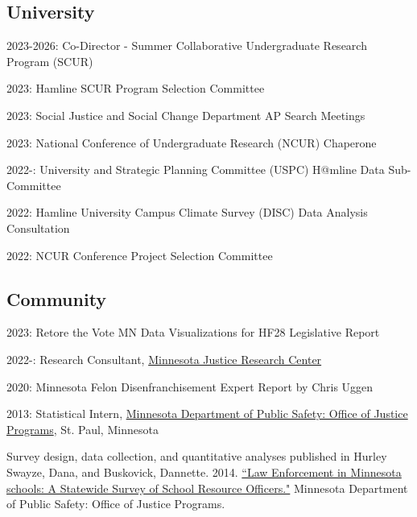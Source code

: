 \documentclass[letterpaper]{article}
\renewenvironment{itemize}{
  \begin{list}{}{
    \setlength{\leftmargin}{1.5em}
  }
}{
  \end{list}
}
\begin{document}
\subsection*{University}
\begin{itemize}
\item 2023-2026: Co-Director - Summer Collaborative Undergraduate Research Program (SCUR)
\item 2023: Hamline SCUR Program Selection Committee
\item 2023: Social Justice and Social Change Department AP Search Meetings
\item 2023: National Conference of Undergraduate Research (NCUR) Chaperone
\item 2022-: University and Strategic Planning Committee (USPC) H@mline Data Sub-Committee
\item 2022: Hamline University Campus Climate Survey (DISC) Data Analysis Consultation
\item 2022: NCUR Conference Project Selection Committee
\end{itemize}

\subsection*{Community}

\begin{itemize}

\item 2023: Retore the Vote MN Data Visualizations for HF28 Legislative Report
\item 2022-: Research Consultant, \href{https://www.mnjrc.org/about-us}{Minnesota Justice Research Center}

\item 2020: Minnesota Felon Disenfranchisement Expert Report by Chris Uggen 

\item 2013: Statistical Intern, \href{https://dps.mn.gov/divisions/ojp/statistical-analysis-center/Pages/default.aspx}{Minnesota Department of Public Safety: Office of Justice Programs}, St. Paul, Minnesota
\begin{itemize}
	\item Survey design, data collection, and quantitative analyses published in Hurley Swayze, Dana, and  Buskovick, Dannette. 2014. \href{https://dps.mn.gov/divisions/ojp/forms-documents/Documents/SRO20REPORT.pdf}{``Law Enforcement in Minnesota schools: A Statewide Survey of School Resource Officers."} Minnesota Department of Public Safety: Office of Justice Programs.
\end{itemize}

\end{itemize}
\end{document}
